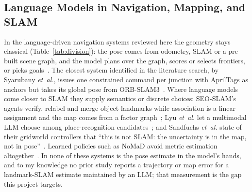 \documentclass[conference]{IEEEtran}
\begin{document}
\subsection{Language Models in Navigation, Mapping, and SLAM}
In the language-driven navigation systems reviewed here the geometry stays classical (Table~\ref{tab:division}):
the pose comes from odometry, SLAM or a pre-built scene graph, and the model plans over the graph, scores or selects
frontiers, or picks goals~\cite{rana2023sayplan,yokoyama2024vlfm,yu2023l3mvn,lee2026spatial}. The closest system
identified in the literature search, by Syarubany \textit{et~al.}, issues one constrained command per junction
with AprilTags as anchors but takes its global pose from ORB-SLAM3~\cite{syarubany2026llm}.
Where language models come closer to SLAM they supply semantics or discrete choices: SEO-SLAM's agents verify,
relabel and merge object landmarks while association is a linear assignment and the map comes from a factor
graph~\cite{hong2025seoslam}; Lyu \textit{et~al.} let a multimodal LLM choose among place-recognition
candidates~\cite{lyu2024tell}; and Sandfuchs \textit{et~al.} state of their gridworld controllers that
``this is not SLAM: the uncertainty is in the map, not in pose''~\cite{sandfuchs2026llms}. Learned policies
such as NoMaD avoid metric estimation altogether~\cite{sridhar2024nomad}. In none of these systems is the pose
estimate in the model's hands, and to my knowledge no prior study reports a trajectory or map error for a
landmark-SLAM estimate maintained by an LLM; that measurement is the gap this project targets.
\end{document}
